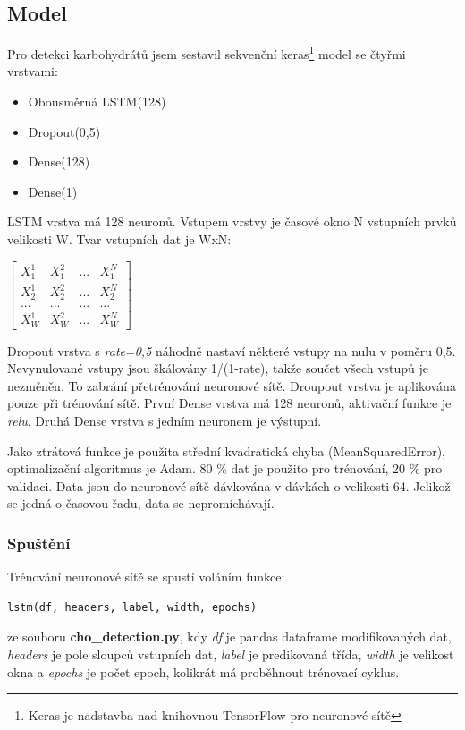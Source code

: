 \subsection{Model}

Pro detekci karbohydrátů jsem sestavil sekvenční keras\footnote{Keras je nadstavba nad knihovnou TensorFlow pro neuronové sítě} model se čtyřmi vrstvami:
\begin{itemize}
\setlength\itemsep{0em}
\item Obousměrná LSTM(128)
\item Dropout(0,5)
\item Dense(128)
\item Dense(1)
\end{itemize}

LSTM vrstva má 128 neuronů. Vstupem vrstvy je časové okno N vstupních prvků velikosti W. Tvar vstupních dat je WxN:

$\begin{bmatrix}
X^{1}_{1} & X^{2}_{1} & ... & X^{N}_{1}\\
X^{1}_{2} & X^{2}_{2} & ... & X^{N}_{2}\\
... & ... & ... & ...\\
X^{1}_{W} & X^{2}_{W} & ... & X^{N}_{W}
\end{bmatrix}$

Dropout vrstva s \textit{rate=0,5} náhodně nastaví některé vstupy na nulu v poměru 0,5. Nevynulované vstupy jsou škálovány 1/(1-rate), takže součet všech vstupů je nezměněn. To zabrání přetrénování neuronové sítě. Droupout vrstva je aplikována pouze při trénování sítě. První Dense vrstva má 128 neuronů, aktivační funkce je \textit{relu}. Druhá Dense vrstva s jedním neuronem je výstupní.

Jako ztrátová funkce je použita střední kvadratická chyba (MeanSquaredError), optimalizační algoritmus je Adam. 80 \% dat je použito pro trénování, 20 \% pro validaci. Data jsou do neuronové sítě dávkována v dávkách o velikosti 64. Jelikož se jedná o časovou řadu, data se nepromíchávají.

\subsubsection{Spuštění}

Trénování neuronové sítě se spustí voláním funkce:
\begin{verbatim}
lstm(df, headers, label, width, epochs)
\end{verbatim}
ze souboru \textbf{cho\_detection.py}, kdy \textit{df} je pandas dataframe modifikovaných dat, \textit{headers} je pole sloupců vstupních dat, \textit{label} je predikovaná třída, \textit{width} je velikost okna a \textit{epochs} je počet epoch, kolikrát má proběhnout trénovací cyklus.

